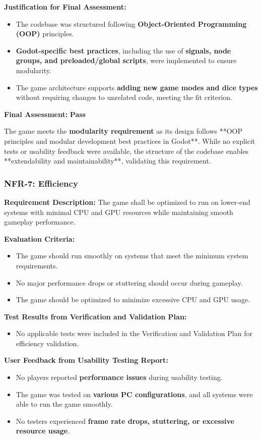\documentclass[12pt, titlepage]{article}
\begin{document}
\textbf{Justification for Final Assessment:}  
\begin{itemize}
    \item The codebase was structured following \textbf{Object-Oriented Programming (OOP)} principles.
    \item \textbf{Godot-specific best practices}, including the use of \textbf{signals, node groups, and preloaded/global scripts}, were implemented to ensure modularity.
    \item The game architecture supports \textbf{adding new game modes and dice types} without requiring changes to unrelated code, meeting the fit criterion.
\end{itemize}

\textbf{Final Assessment:} \textbf{Pass}  

The game meets the \textbf{modularity requirement} as its design follows **OOP principles and modular development best practices in Godot**. While no explicit tests or usability feedback were available, the structure of the codebase enables **extendability and maintainability**, validating this requirement.


\subsubsection{NFR-7: Efficiency}
\label{NFR7}

\textbf{Requirement Description:}  
The game shall be optimized to run on lower-end systems with minimal CPU and GPU resources while maintaining smooth gameplay performance.

\textbf{Evaluation Criteria:}  
\begin{itemize}
    \item The game should run smoothly on systems that meet the minimum system requirements.
    \item No major performance drops or stuttering should occur during gameplay.
    \item The game should be optimized to minimize excessive CPU and GPU usage.
\end{itemize}

\textbf{Test Results from Verification and Validation Plan:}  
\begin{itemize}
    \item No applicable tests were included in the Verification and Validation Plan for efficiency validation.
\end{itemize}

\textbf{User Feedback from Usability Testing Report:}  
\begin{itemize}
    \item No players reported \textbf{performance issues} during usability testing.
    \item The game was tested on \textbf{various PC configurations}, and all systems were able to run the game smoothly.
    \item No testers experienced \textbf{frame rate drops, stuttering, or excessive resource usage}.
\end{itemize}
\end{document}
